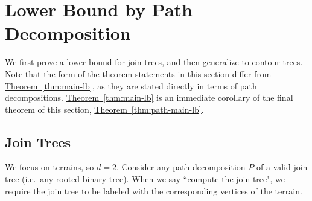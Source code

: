 \documentclass[11pt]{article}
\theoremstyle{definition}
\newcommand{\Thm}[1]{\hyperref[thm:#1]{Theorem~\ref*{thm:#1}}} %
\begin{document}



\section{Lower Bound by Path Decomposition}
\label{sec:lb}
We first prove a lower bound for join trees, and then generalize to contour trees.
Note that the form of the theorem statements in this section differ from \Thm{main-lb}, 
as they are stated directly in terms of path decompositions.  \Thm{main-lb} 
is an immediate corollary of the final theorem of this section, \Thm{path-main-lb}.

\subsection{Join Trees}

 
We focus on terrains, so $d=2$.
Consider any path decomposition $P$ of a valid join tree (i.e.\ any rooted binary tree).
When we say ``compute the join tree", we require the join tree to
be labeled with the corresponding vertices of the terrain.
\end{document}
